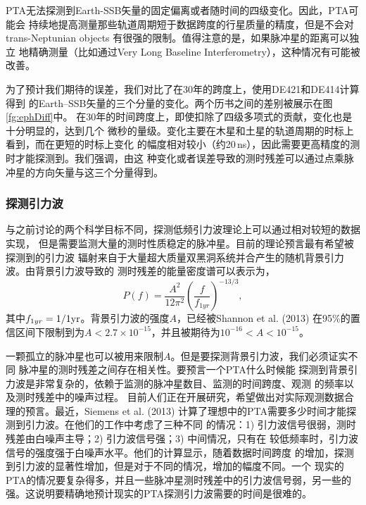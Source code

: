 PTA无法探测到Earth-SSB矢量的固定偏离或者随时间的四级变化。因此，PTA可能会
持续地提高测量那些轨道周期短于数据跨度的行星质量的精度，但是不会对trans-Neptunian objects
有很强的限制。值得注意的是，如果脉冲星的距离可以独立
地精确测量（比如通过Very Long Baseline Interferometry），这种情况有可能被改善。

为了预计我们期待的误差，我们对比了在30年的跨度上，使用DE421和DE414计算得到
的Earth--SSB矢量的三个分量的变化。两个历书之间的差别被展示在图\ref{fg:ephDiff}中。
在30年的时间跨度上，即使扣除了四级多项式的贡献，变化也是十分明显的，达到几个
微秒的量级。变化主要在木星和土星的轨道周期的时标上看到，而在更短的时标上变化
的幅度相对较小（约20\,ns），因此需要更高精度的测时才能探测到。我们强调，由这
种变化或者误差导致的测时残差可以通过点乘脉冲星的方向矢量与这三个分量得到。

\subsubsection{探测引力波}

与之前讨论的两个科学目标不同，探测低频引力波理论上可以通过相对较短的数据实现，
但是需要监测大量的测时性质稳定的脉冲星。目前的理论预言最有希望被探测到的引力波
辐射来自于大量超大质量双黑洞系统并合产生的随机背景引力波。由背景引力波导致的
测时残差的能量密度谱可以表示为，
\begin{equation}
\label{eqn:psd}
P(f) = \frac{A^2}{12\pi^2}\left(\frac{f}{f_{1yr}}\right)^{-13/3},
\end{equation}
其中$f_{1yr} = 1/{1 {\rm yr}}$。背景引力波的强度$A$，已经被Shannon et al. (2013)
在95\%的置信区间下限制到为$A < 2.7 \times 10^{-15}$，并且被期待为$10^{-16} < A < 10^{-15}$\supercite{ses13}。

一颗孤立的脉冲星也可以被用来限制$A$。但是要探测背景引力波，我们必须证实不同
脉冲星的测时残差之间存在相关性\supercite{hd83}。要预言一个PTA什么时候能
探测到背景引力波是非常复杂的，依赖于监测的脉冲星数目、监测的时间跨度、观测
的频率以及测时残差中的噪声过程。
目前人们正在开展研究，希望做出对实际观测数据合理的预言。最近，Siemens et al. (2013)\supercite{sejr13}
计算了理想中的PTA需要多少时间才能探测到引力波。在他们的工作中考虑了三种不同
的情况：1) 引力波信号很弱，测时残差由白噪声主导；2) 引力波信号强；3) 中间情况，只有在
较低频率时，引力波信号的强度强于白噪声水平。他们的计算显示，随着数据时间跨度
的增加，探测到引力波的显著性增加，但是对于不同的情况，增加的幅度不同。一个
现实的PTA的情况要复杂得多，并且一些脉冲星测时残差中的引力波信号弱，另一些的
强。这说明要精确地预计现实的PTA探测引力波需要的时间是很难的。

